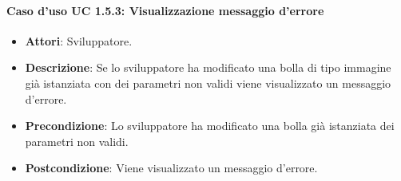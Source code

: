 \paragraph{Caso d'uso UC 1.5.3: Visualizzazione messaggio d'errore}

\FloatBarrier
\begin{itemize}
\item\textbf{Attori}: Sviluppatore.
\item\textbf{Descrizione}: Se lo sviluppatore ha modificato una bolla di tipo immagine già istanziata con dei parametri non validi viene visualizzato un messaggio d'errore.
\item\textbf{Precondizione}: Lo sviluppatore ha modificato una bolla già istanziata dei parametri non validi.
\item\textbf{Postcondizione}: Viene visualizzato un messaggio d'errore.
\end{itemize}
